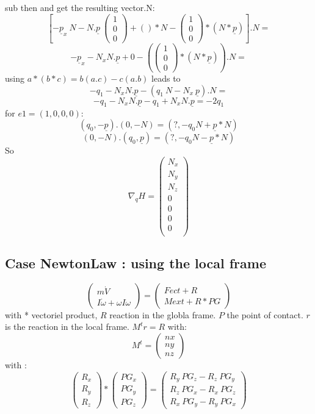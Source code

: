 sub then and get the resulting vector.N:
\[\left[ -\underline p_x~N -N.\underline p~\left(\begin{array}{c}1\\0\\0\end{array}\right)+()*N-\left(\begin{array}{c}1\\0\\0\end{array}\right)*(N*\underline p)\right].N=\]
\[-\underline p_x-N_xN.\underline p+0-(\left(\begin{array}{c}1\\0\\0\end{array}\right)*(N*\underline p)).N=\]
  using $a*(b*c)=b(a.c)-c(a.b)$ leads to
  \[-q_1-N_xN.\underline p-(q_1~N-N_x~\underline p).N=\]
\[-q_1-N_xN.\underline p-q_1+N_xN.\underline p=-2q_1\]
for $e1=(1,0,0,0)$:
\[(q_0,-\underline p).(0,-N)=(?,-q_0N+\underline p*N)\]
\[(0,-N).(q_0,\underline p)=(?,-q_0N-\underline p*N)\]
So
\[\nabla _q H =\left(\begin{array}{c} N_x\\N_y\\N_z\\
0\\
0\\
0\\
0\\
\end{array}\right)\]


\subsection{Case NewtonLaw : using the local frame}

\[\left(\begin{array}{c}m \dot V\\I \dot \omega + \omega I \omega \end{array}\right)= \left(\begin{array}{c}Fect+R\\Mext + R*PG \end{array}\right)\]
  with * vectoriel product, $R$ reaction in the globla frame. $P$ the point of contact.
  $r$ is the reaction in the local frame.  $M^t r=R$ with:
  \[M^t=\left(\begin{array}{c} nx \\ny\\nz \end{array}\right)\]
  with :
  \[\left(\begin{array}{c} R_x \\R_y\\R_z \end{array}\right)*\left(\begin{array}{c} PG_x \\PG_y\\PG_z \end{array}\right) =\left(\begin{array}{c} R_y~PG_z - R_z~PG_y \\R_z~PG_x-R_x~PG_z \\R_x~PG_y-R_y~PG_x \end{array}\right)\]

